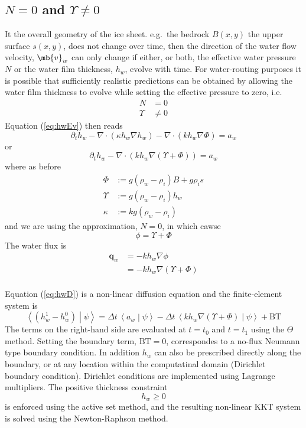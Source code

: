 \documentclass[10pt,a4paper]{article}
\newcommand{\braket}[2]{\left \langle #1 \middle| #2 \right \rangle}
\begin{document}
\subsection{$N=0$ and $\Upsilon\neq0$}
It the overall geometry of the ice sheet. e.g.\ the bedrock $B(x,y)$
the upper surface $s(x,y)$, does not change over time, then the
direction of the water flow velocity, $\mb{v}_w$ can only change if
either, or both, the effective water pressure $N$ or the water film
thickness, $h_w$, evolve with time. For water-routing purposes it is
possible that sufficiently realistic predictions can be obtained by
allowing the water film thickness to evolve while setting the
effective pressure to zero, i.e.\
\begin{align*}
  N&=0 \\
  \Upsilon &\neq 0
\end{align*}
Equation (\ref{eq:hwEv}) then reads
\begin{equation}
  \partial_t h_w   - \nabla \cdot ( \kappa h_w \nabla h_w ) - \nabla \cdot (k h_w \nabla \Phi ) = a_w 
\label{eq:hwU}
\end{equation}
or
\begin{equation}
  \partial_t h_w   - \nabla \cdot\left (  k h_w \nabla (\Upsilon + \Phi ) \right )  = a_w 
\label{eq:hwD}
\end{equation}
where as before
\begin{align*}
  \Phi&:= g (\rho_w -\rho_i) B + g \rho_i s \\
  \Upsilon&:= g (\rho_w-\rho_i)  h_w  \\
  \kappa&:= k g (\rho_w-\rho_i)
\end{align*}
and we are using the approximation, $N=0$, in which cawse 
\[
\phi = \Upsilon +\Phi
\]
The water flux is
\begin{align*}
  \bm{q}_w & = -k h_w \nabla \phi\\
           & = -k h_w \nabla (\Upsilon + \Phi)\\
\end{align*}

Equation (\ref{eq:hwD}) is a non-linear diffusion equation and the finite-element system is
\[
\braket{(h_w^1 - h_w^0)}{\psi}    = \Delta t \,\braket{a_w}{\psi} - \Delta t \, \braket{k h_w \nabla (\Upsilon + \Phi )}{\psi} + \text{BT}
\]
The terms on the right-hand side are evaluated at $t=t_0$ and $t=t_1$
using the $\Theta$ method. Setting the boundary term, $\text{BT}=0$,
correspondes to a no-flux Neumann type boundary condition. In addition
$h_w$ can also be prescribed directly along the boundary, or at any
location within the computatinal domain (Dirichlet boundary
condition). Dirichlet conditions are implemented using Lagrange
multipliers. The positive thickness constraint
\[
h_w \ge 0
\]
is enforced using the active set method, and the resulting non-linear
KKT system is solved using the Newton-Raphson method.
\end{document}
